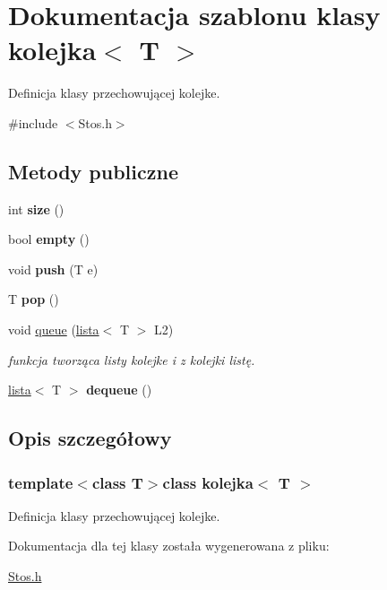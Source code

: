 \hypertarget{classkolejka}{\section{\-Dokumentacja szablonu klasy kolejka$<$ \-T $>$}
\label{classkolejka}
}


\-Definicja klasy przechowującej kolejke.  




{\ttfamily \#include $<$\-Stos.\-h$>$}

\subsection*{\-Metody publiczne}
\begin{DoxyCompactItemize}
\item 
\hypertarget{classkolejka_a97c873e61c9d08a08ddec5c0a784aaec}{int {\bfseries size} ()}\label{classkolejka_a97c873e61c9d08a08ddec5c0a784aaec}

\item 
\hypertarget{classkolejka_a2a5984247b91f8d4b96c1104755c14ee}{bool {\bfseries empty} ()}\label{classkolejka_a2a5984247b91f8d4b96c1104755c14ee}

\item 
\hypertarget{classkolejka_a9ab5091d52ebfe6cb4785bfd4ec2a0b9}{void {\bfseries push} (\-T e)}\label{classkolejka_a9ab5091d52ebfe6cb4785bfd4ec2a0b9}

\item 
\hypertarget{classkolejka_aed8feb84d0962f52961325340bd6ee92}{\-T {\bfseries pop} ()}\label{classkolejka_aed8feb84d0962f52961325340bd6ee92}

\item 
\hypertarget{classkolejka_a3802e595aad03b06e547714f5aa73a1d}{void \hyperlink{classkolejka_a3802e595aad03b06e547714f5aa73a1d}{queue} (\hyperlink{classlista}{lista}$<$ \-T $>$ \-L2)}\label{classkolejka_a3802e595aad03b06e547714f5aa73a1d}

\begin{DoxyCompactList}\small\item\em funkcja tworząca listy kolejke i z kolejki listę. \end{DoxyCompactList}\item 
\hypertarget{classkolejka_a88cae02e37f9f6a7891c45f6490de6d6}{\hyperlink{classlista}{lista}$<$ \-T $>$ {\bfseries dequeue} ()}\label{classkolejka_a88cae02e37f9f6a7891c45f6490de6d6}

\end{DoxyCompactItemize}


\subsection{\-Opis szczegółowy}
\subsubsection*{template$<$class T$>$class kolejka$<$ T $>$}

\-Definicja klasy przechowującej kolejke. 

\-Dokumentacja dla tej klasy została wygenerowana z pliku\-:\begin{DoxyCompactItemize}
\item 
\hyperlink{_stos_8h}{\-Stos.\-h}\end{DoxyCompactItemize}
